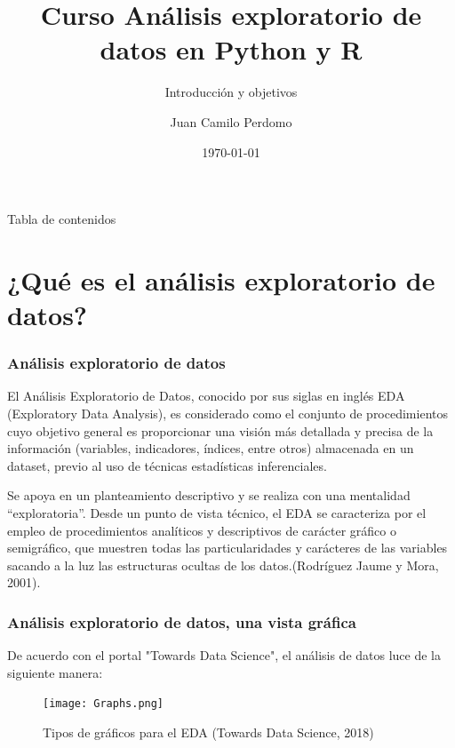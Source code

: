 \documentclass{libs/XJTLU_format}
\title[Curso Análisis exploratorio de datos en Python y R]{\huge\textbf{Curso Análisis exploratorio de datos en Python y R}}
\subtitle{Introducción y objetivos}
\author{Juan Camilo Perdomo}
\institute[Universidad del Rosario]{
    \normalsize{\email{juan.perdomor@urosario.edu.co}}
    \newline
    \university{Universidad del Rosario}
    \newline
    \department{Bogotá, Colombia}
}
\date{\today}
\begin{document}


\begin{frame}{}
    \maketitle
\end{frame}

\begin{frame}{Tabla de contenidos}
    \tableofcontents
\end{frame}

\section{¿Qué es el análisis exploratorio de datos?}

\begin{frame}[fragile] 
    \frametitle{Análisis exploratorio de datos}
    \begin{center}
        El Análisis Exploratorio de Datos, conocido por sus siglas en inglés EDA (Exploratory Data Analysis), es considerado como el conjunto de procedimientos cuyo objetivo general es proporcionar una visión más detallada y precisa de la información (variables, indicadores, índices, entre otros) almacenada en un dataset, previo al uso de técnicas estadísticas inferenciales. \newline
    \end{center}

    \begin{center}
        Se apoya en un planteamiento descriptivo y se realiza  con una mentalidad “exploratoria”. Desde un punto de vista técnico, el EDA se caracteriza por el empleo de procedimientos analíticos y descriptivos de carácter gráfico o semigráfico, que muestren todas las particularidades y carácteres de las variables sacando a la luz las estructuras ocultas de los datos.(Rodríguez Jaume y Mora, 2001).
    \end{center}
\end{frame}


\begin{frame}[fragile] 
    \frametitle{Análisis exploratorio de datos, una vista gráfica}
    
 De acuerdo con el portal "Towards Data Science", el análisis de datos luce de la siguiente manera: \newline
 
     \begin{figure}[H]
        \centering
            \texttt{[image: Graphs.png]}
        \caption{Tipos de gráficos para el EDA (Towards Data Science, 2018)}
    \end{figure}

\end{frame}
\end{document}
